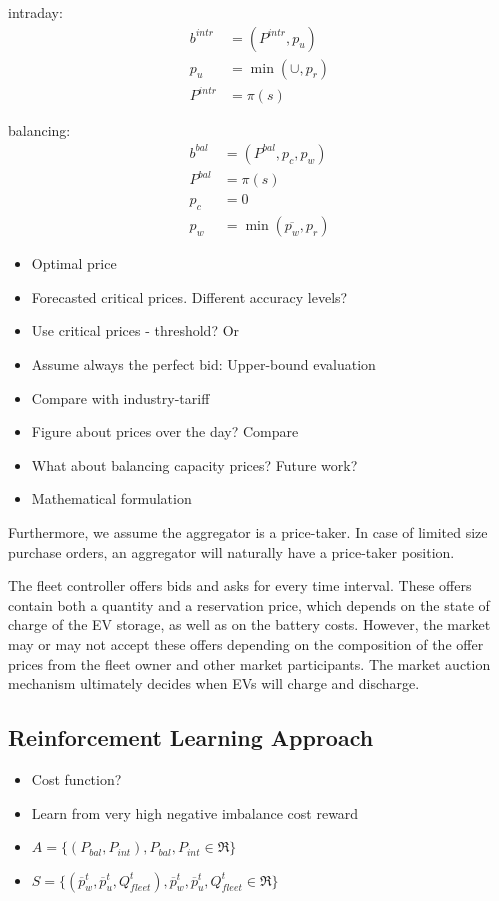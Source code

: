 \documentclass[a4paper, 12pt]{article}
\begin{document}
intraday:
\begin{equation}
\begin{split}
    b^{intr} &= (P^{intr}, p_u) \\
    p_u &= \min(\cup{}, p_r) \\
    P^{intr} &= \pi(s)
\end{split}
\end{equation}

balancing:
\begin{equation}
\begin{split}
    b^{bal} &= (P^{bal}, p_c, p_w) \\
    P^{bal} &= \pi(s) \\
    p_c &= 0 \\
    p_w &= \min(\overline{p_w}, p_r)
\end{split}
\end{equation}

\begin{itemize}
\item Optimal price
\item Forecasted critical prices. Different accuracy levels?
\item Use critical prices - threshold? Or
\item Assume always the perfect bid: Upper-bound evaluation
\item Compare with industry-tariff
\item Figure about prices over the day? Compare
\item What about balancing capacity prices? Future work?
\item Mathematical formulation
\end{itemize}

Furthermore, we assume the
aggregator is a price-taker. In case of limited size purchase
orders, an aggregator will naturally have a price-taker position.

The fleet controller offers bids and asks for every time interval. These offers
contain both a quantity and a reservation price, which depends on the state of
charge of the EV storage, as well as on the battery costs. However, the market
may or may not accept these offers depending on the composition of the offer
prices from the fleet owner and other market participants. The market auction
mechanism ultimately decides when EVs will charge and discharge.

\subsection{Reinforcement Learning Approach \label{sec-model-rl}}
\label{sec:orgd242ea1}
\begin{itemize}
\item Cost function?
\item Learn from very high negative imbalance cost reward

\item \(A = \{(P_{bal}, P_{int}), P_{bal}, P_{int} \in \Re \}\)
\item \(S = \{(\overline{p}_w^t, \overline{p}_u^t, Q_{fleet}^t), \overline{p}_w^t,
  \overline{p}_u^t, Q_{fleet}^t \in \Re \}\)
\end{itemize}
\end{document}
